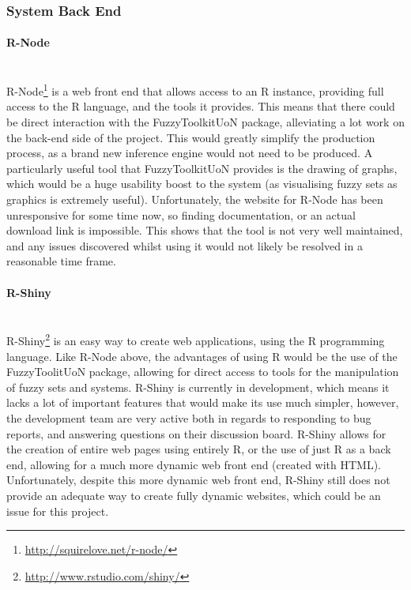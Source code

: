\subsubsection{System Back End}
\paragraph{R-Node}\ \\
R-Node\footnote{\url{http://squirelove.net/r-node/}} is a web front end that allows access to an R instance, providing full access to the R language, and the tools it provides. This means that there could be direct interaction with the FuzzyToolkitUoN package, alleviating a lot work on the back-end side of the project. This would greatly simplify the production process, as a brand new inference engine would not need to be produced. A particularly useful tool that FuzzyToolkitUoN provides is the drawing of graphs, which would be a huge usability boost to the system (as visualising fuzzy sets as graphics is extremely useful). Unfortunately, the website for R-Node has been unresponsive for some time now, so finding documentation, or an actual download link is impossible. This shows that the tool is not very well maintained, and any issues discovered whilst using it would not likely be resolved in a reasonable time frame.

\paragraph{R-Shiny}\ \\
R-Shiny\footnote{\url{http://www.rstudio.com/shiny/}} is an easy way to create web applications, using the R programming language. Like R-Node above, the advantages of using R would be the use of the FuzzyToolitUoN package, allowing for direct access to tools for the manipulation of fuzzy sets and systems. R-Shiny is currently in development, which means it lacks a lot of important features that would make its use much simpler, however, the development team are very active both in regards to responding to bug reports, and answering questions on their discussion board. R-Shiny allows for the creation of entire web pages using entirely R, or the use of just R as a back end, allowing for a much more dynamic web front end (created with HTML). Unfortunately, despite this more dynamic web front end, R-Shiny still does not provide an adequate way to create fully dynamic websites, which could be an issue for this project.


